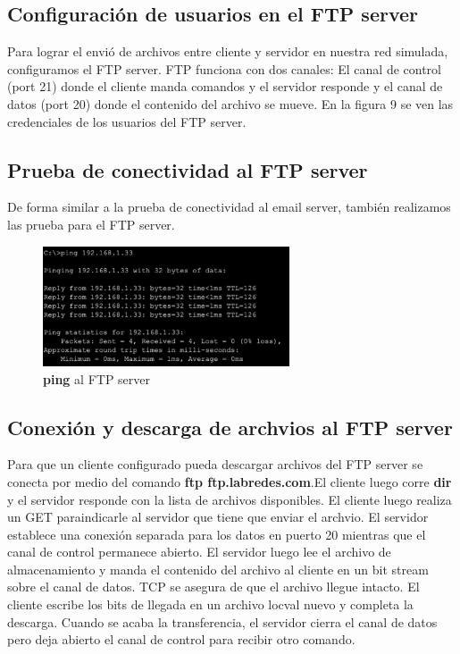 \documentclass[10pt]{article}
\begin{document}
\subsection{Configuración de usuarios en el FTP server}

Para lograr el envió de archivos entre cliente y servidor en nuestra red simulada, configuramos el FTP server. FTP funciona con dos canales: El canal de control (port 21) donde el cliente manda comandos y el servidor responde y el canal de datos (port 20) donde el contenido del archivo se mueve. En la figura 9 se ven las credenciales de los usuarios del FTP server.


\subsection{Prueba de conectividad al FTP server}
De forma similar a la prueba de conectividad al email server, también realizamos las prueba para el FTP server. 

\begin{figure}[H]
    \centering
    \includegraphics[width=0.65\textwidth]{lab-01-screenshots/46-2-ping-ftp}
    \caption{\textbf{ping} al FTP server}
\end{figure}

\subsection{Conexión y descarga de archvios al FTP server}
Para que un cliente configurado pueda descargar archivos del FTP server se conecta por medio del comando \textbf{ftp ftp.labredes.com}.El cliente luego corre \textbf{dir} y el servidor responde con la lista de archivos disponibles. El cliente luego realiza un GET paraindicarle al servidor que tiene que enviar el archvio. El servidor establece una   conexión separada para los datos en puerto 20 mientras que el canal de control permanece abierto. El servidor luego lee el archivo de almacenamiento y manda el contenido del archivo al cliente en un bit stream sobre el canal de datos. TCP se asegura de que el archivo llegue intacto. El cliente escribe los bits de llegada en un archivo locval nuevo y completa la descarga. Cuando se acaba la transferencia, el servidor cierra el canal de datos pero deja abierto el canal de control para recibir otro comando. 
\end{document}

